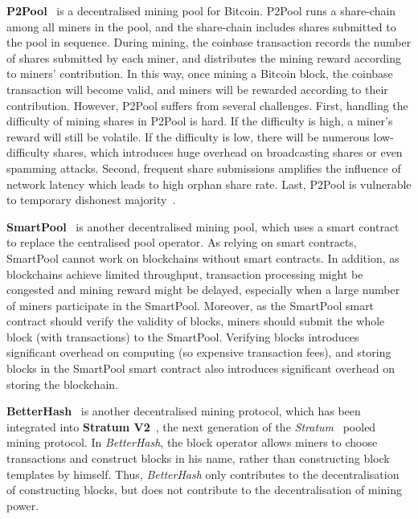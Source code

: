 \textbf{P2Pool}~\cite{voight2011p2pool} is a decentralised mining pool for Bitcoin.
P2Pool runs a share-chain among all miners in the pool, and the share-chain includes shares submitted to the pool in sequence.
During mining, the coinbase transaction records the number of shares submitted by each miner, and distributes the mining reward according to miners' contribution.
In this way, once mining a Bitcoin block, the coinbase transaction will become valid, and miners will be rewarded according to their contribution.
However, P2Pool suffers from several challenges.
First, handling the difficulty of mining shares in P2Pool is hard.
If the difficulty is high, a miner's reward will still be volatile.
If the difficulty is low, there will be numerous low-difficulty shares, which introduces huge overhead on broadcasting shares or even spamming attacks.
Second, frequent share submissions amplifies the influence of network latency which leads to high orphan share rate.
Last, P2Pool is vulnerable to temporary dishonest majority~\cite{decentralised-mining-pool-security}.

\textbf{SmartPool}~\cite{luu2017smartpool} is another decentralised mining pool, which uses a smart contract to replace the centralised pool operator.
As relying on smart contracts, SmartPool cannot work on blockchains without smart contracts.
In addition, as blockchains achieve limited throughput, transaction processing might be congested and mining reward might be delayed, especially when a large number of miners participate in the SmartPool.
Moreover, as the SmartPool smart contract should verify the validity of blocks, miners should submit the whole block (with transactions) to the SmartPool.
Verifying blocks introduces significant overhead on computing (so expensive transaction fees), and storing blocks in the SmartPool smart contract also introduces significant overhead on storing the blockchain.



\textbf{BetterHash}~\cite{draft-bip-BetterHash} is another decentralised mining protocol, which has been integrated into \textbf{Stratum V2}~\cite{stratum-v2}, the next generation of the \textit{Stratum}~\cite{stratum} pooled mining protocol.
In \textit{BetterHash}, the block operator allows miners to choose transactions and construct blocks in his name, rather than constructing block templates by himself.
Thus, \textit{BetterHash} only contributes to the decentralisation of constructing blocks, but does not contribute to the decentralisation of mining power.